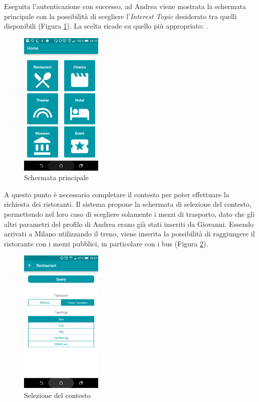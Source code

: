Eseguita l'autenticazione con successo, ad Andrea viene mostrata la schermata principale con la possibilità di scegliere l'\emph{Interest Topic} desiderato tra quelli disponibili (Figura \ref{fig:usecase-home}). La scelta ricade su quello più appropriato: .

\begin{figure}[H]
	\centering
	\includegraphics[width=0.35\textwidth]{4-progettazione-alto-livello/Immagini/home_caso_d'uso.png}
	\caption{Schermata principale}\label{fig:usecase-home}
\end{figure}

A questo punto è necessario completare il contesto per poter effettuare la richiesta dei ristoranti. Il sistema propone la schermata di selezione del contesto, permettendo nel loro caso di scegliere solamente i mezzi di trasporto, dato che gli altri parametri del profilo di Andrea erano già stati inseriti da Giovanni. Essendo arrivati a Milano utilizzando il treno, viene inserita la possibilità di raggiungere il ristorante con i mezzi pubblici, in particolare con i bus (Figura \ref{fig:usecase-contesto}). 

\begin{figure}[ht]
	\centering
	\includegraphics[width=0.35\textwidth]{4-progettazione-alto-livello/Immagini/contesto_caso_d'uso.png}
	\caption{Selezione del contesto}\label{fig:usecase-contesto}
\end{figure}

